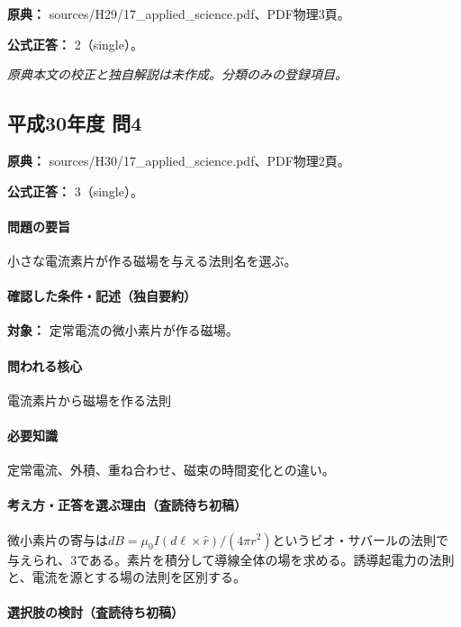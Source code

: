 \noindent\textbf{原典：} sources/H29/17\_applied\_science.pdf、PDF物理3頁。

\textbf{公式正答：} 2（single）。

\par\textit{原典本文の校正と独自解説は未作成。分類のみの登録項目。}

\subsection{平成30年度 問4}
\label{q:h30-reg-applied-04}

\noindent\textbf{原典：} sources/H30/17\_applied\_science.pdf、PDF物理2頁。

\textbf{公式正答：} 3（single）。

\paragraph{問題の要旨} 小さな電流素片が作る磁場を与える法則名を選ぶ。

\paragraph{確認した条件・記述（独自要約）}\mbox{}\par

\noindent\textbf{対象：} 定常電流の微小素片が作る磁場。\par

\paragraph{問われる核心} 電流素片から磁場を作る法則

\paragraph{必要知識} 定常電流、外積、重ね合わせ、磁束の時間変化との違い。

\paragraph{考え方・正答を選ぶ理由（査読待ち初稿）} 微小素片の寄与は\(dB=\mu_0 I(d\ell\times\hat r)/(4\pi r^2)\)というビオ・サバールの法則で与えられ、3である。素片を積分して導線全体の場を求める。誘導起電力の法則と、電流を源とする場の法則を区別する。

\paragraph{選択肢の検討（査読待ち初稿）}\mbox{}\par

